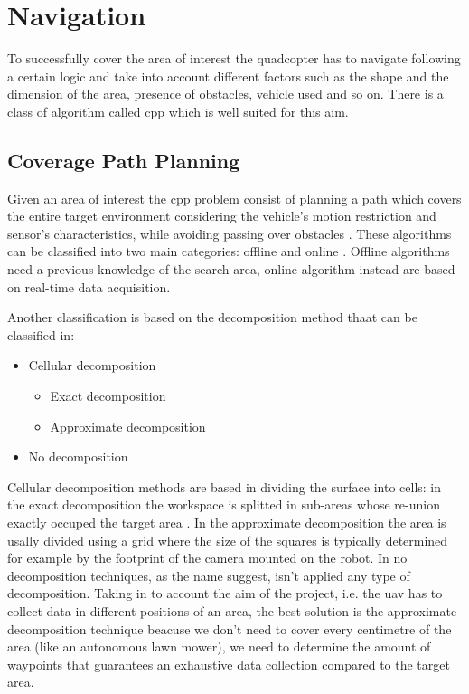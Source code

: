 \section{Navigation}
To successfully cover the area of interest the quadcopter has to navigate following a certain logic and take into account different factors such as the shape and the dimension of the area, presence of obstacles, vehicle used and so on. There is a class of algorithm called \ac{cpp} which is well suited for this aim.

\subsection{Coverage Path Planning}
Given an area of interest the \ac{cpp} problem consist of planning a path which covers the entire target environment considering the vehicle's motion restriction and sensor's characteristics, while avoiding passing over obstacles \cite{cabreira2019survey}. These algorithms can be classified into two main categories: offline and online \cite{fevgas2022coverage}. Offline algorithms need a previous knowledge of the search area, online algorithm instead are based on real-time data acquisition.

Another classification is based on the decomposition method thaat can be classified in:
\begin{itemize}
	\item Cellular decomposition
	\begin{itemize}
		\item Exact decomposition
		\item Approximate decomposition
	\end{itemize}
	\item No decomposition
\end{itemize}
Cellular decomposition methods are based in dividing the surface into cells: in the exact decomposition the workspace is splitted in sub-areas whose re-union exactly occuped the target area \cite{cabreira2019survey}. In the approximate decomposition the area is usally divided using a grid where the size of the squares is typically determined for example by the footprint of the camera mounted on the robot. In no decomposition techniques, as the name suggest, isn't applied any type of decomposition.
Taking in to account the aim of the project, i.e. the \ac{uav} has to collect data in different positions of an area, the best solution is the approximate decomposition technique beacuse we don't need to cover every centimetre of the area (like an autonomous lawn mower), we need to determine the amount of waypoints that guarantees an exhaustive data collection compared to the target area.